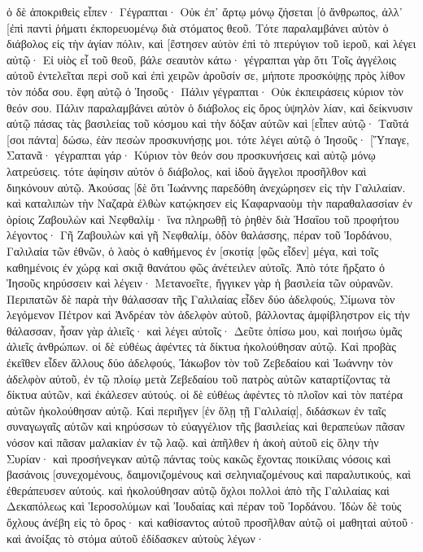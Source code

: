ὁ δὲ ἀποκριθεὶς εἶπεν· Γέγραπται· Οὐκ ἐπ᾽ ἄρτῳ μόνῳ ζήσεται [ὁ ἄνθρωπος, ἀλλ᾽ [ἐπὶ παντὶ ῥήματι ἐκπορευομένῳ διὰ στόματος θεοῦ. 
Τότε παραλαμβάνει αὐτὸν ὁ διάβολος εἰς τὴν ἁγίαν πόλιν, καὶ [ἔστησεν αὐτὸν ἐπὶ τὸ πτερύγιον τοῦ ἱεροῦ, 
καὶ λέγει αὐτῷ· Εἰ υἱὸς εἶ τοῦ θεοῦ, βάλε σεαυτὸν κάτω· γέγραπται γὰρ ὅτι Τοῖς ἀγγέλοις αὐτοῦ ἐντελεῖται περὶ σοῦ καὶ ἐπὶ χειρῶν ἀροῦσίν σε, μήποτε προσκόψῃς πρὸς λίθον τὸν πόδα σου. 
ἔφη αὐτῷ ὁ Ἰησοῦς· Πάλιν γέγραπται· Οὐκ ἐκπειράσεις κύριον τὸν θεόν σου. 
Πάλιν παραλαμβάνει αὐτὸν ὁ διάβολος εἰς ὄρος ὑψηλὸν λίαν, καὶ δείκνυσιν αὐτῷ πάσας τὰς βασιλείας τοῦ κόσμου καὶ τὴν δόξαν αὐτῶν 
καὶ [εἶπεν αὐτῷ· Ταῦτά [σοι πάντα] δώσω, ἐὰν πεσὼν προσκυνήσῃς μοι. 
τότε λέγει αὐτῷ ὁ Ἰησοῦς· [Ὕπαγε, Σατανᾶ· γέγραπται γάρ· Κύριον τὸν θεόν σου προσκυνήσεις καὶ αὐτῷ μόνῳ λατρεύσεις. 
τότε ἀφίησιν αὐτὸν ὁ διάβολος, καὶ ἰδοὺ ἄγγελοι προσῆλθον καὶ διηκόνουν αὐτῷ. 
Ἀκούσας [δὲ ὅτι Ἰωάννης παρεδόθη ἀνεχώρησεν εἰς τὴν Γαλιλαίαν. 
καὶ καταλιπὼν τὴν Ναζαρὰ ἐλθὼν κατῴκησεν εἰς Καφαρναοὺμ τὴν παραθαλασσίαν ἐν ὁρίοις Ζαβουλὼν καὶ Νεφθαλίμ· 
ἵνα πληρωθῇ τὸ ῥηθὲν διὰ Ἠσαΐου τοῦ προφήτου λέγοντος· 
Γῆ Ζαβουλὼν καὶ γῆ Νεφθαλίμ, ὁδὸν θαλάσσης, πέραν τοῦ Ἰορδάνου, Γαλιλαία τῶν ἐθνῶν, 
ὁ λαὸς ὁ καθήμενος ἐν [σκοτίᾳ [φῶς εἶδεν] μέγα, καὶ τοῖς καθημένοις ἐν χώρᾳ καὶ σκιᾷ θανάτου φῶς ἀνέτειλεν αὐτοῖς. 
Ἀπὸ τότε ἤρξατο ὁ Ἰησοῦς κηρύσσειν καὶ λέγειν· Μετανοεῖτε, ἤγγικεν γὰρ ἡ βασιλεία τῶν οὐρανῶν. 
Περιπατῶν δὲ παρὰ τὴν θάλασσαν τῆς Γαλιλαίας εἶδεν δύο ἀδελφούς, Σίμωνα τὸν λεγόμενον Πέτρον καὶ Ἀνδρέαν τὸν ἀδελφὸν αὐτοῦ, βάλλοντας ἀμφίβληστρον εἰς τὴν θάλασσαν, ἦσαν γὰρ ἁλιεῖς· 
καὶ λέγει αὐτοῖς· Δεῦτε ὀπίσω μου, καὶ ποιήσω ὑμᾶς ἁλιεῖς ἀνθρώπων. 
οἱ δὲ εὐθέως ἀφέντες τὰ δίκτυα ἠκολούθησαν αὐτῷ. 
Καὶ προβὰς ἐκεῖθεν εἶδεν ἄλλους δύο ἀδελφούς, Ἰάκωβον τὸν τοῦ Ζεβεδαίου καὶ Ἰωάννην τὸν ἀδελφὸν αὐτοῦ, ἐν τῷ πλοίῳ μετὰ Ζεβεδαίου τοῦ πατρὸς αὐτῶν καταρτίζοντας τὰ δίκτυα αὐτῶν, καὶ ἐκάλεσεν αὐτούς. 
οἱ δὲ εὐθέως ἀφέντες τὸ πλοῖον καὶ τὸν πατέρα αὐτῶν ἠκολούθησαν αὐτῷ. 
Καὶ περιῆγεν [ἐν ὅλῃ τῇ Γαλιλαίᾳ], διδάσκων ἐν ταῖς συναγωγαῖς αὐτῶν καὶ κηρύσσων τὸ εὐαγγέλιον τῆς βασιλείας καὶ θεραπεύων πᾶσαν νόσον καὶ πᾶσαν μαλακίαν ἐν τῷ λαῷ. 
καὶ ἀπῆλθεν ἡ ἀκοὴ αὐτοῦ εἰς ὅλην τὴν Συρίαν· καὶ προσήνεγκαν αὐτῷ πάντας τοὺς κακῶς ἔχοντας ποικίλαις νόσοις καὶ βασάνοις [συνεχομένους, δαιμονιζομένους καὶ σεληνιαζομένους καὶ παραλυτικούς, καὶ ἐθεράπευσεν αὐτούς. 
καὶ ἠκολούθησαν αὐτῷ ὄχλοι πολλοὶ ἀπὸ τῆς Γαλιλαίας καὶ Δεκαπόλεως καὶ Ἱεροσολύμων καὶ Ἰουδαίας καὶ πέραν τοῦ Ἰορδάνου. 
Ἰδὼν δὲ τοὺς ὄχλους ἀνέβη εἰς τὸ ὄρος· καὶ καθίσαντος αὐτοῦ προσῆλθαν αὐτῷ οἱ μαθηταὶ αὐτοῦ· 
καὶ ἀνοίξας τὸ στόμα αὐτοῦ ἐδίδασκεν αὐτοὺς λέγων· 

